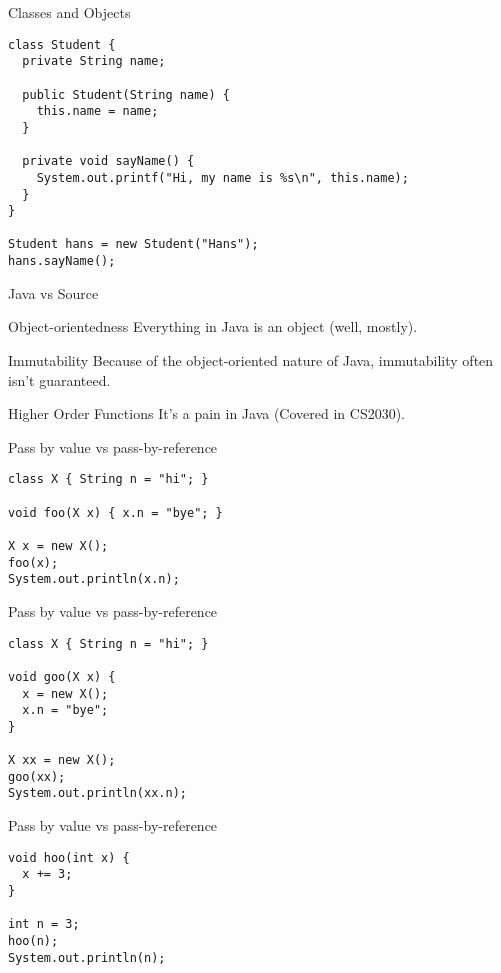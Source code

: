 \documentclass[presentation]{beamer}
\begin{document}
\begin{frame}[label={sec:org1b4f8ca},fragile]{Classes and Objects}
 \begin{verbatim}
class Student {
  private String name;

  public Student(String name) {
    this.name = name;
  }

  private void sayName() {
    System.out.printf("Hi, my name is %s\n", this.name);
  }
}

Student hans = new Student("Hans");
hans.sayName();
\end{verbatim}
\end{frame}
\begin{frame}[<+->][label={sec:org5042783}]{Java vs Source}
\begin{block}{Object-orientedness}
Everything in Java is an object (well, mostly).
\end{block}
\begin{block}{Immutability}
Because of the object-oriented nature of Java, immutability
often isn't guaranteed.
\end{block}
\begin{block}{Higher Order Functions}
It's a pain in Java (Covered in CS2030).
\end{block}
\end{frame}
\begin{frame}[label={sec:org6b306d6},fragile]{Pass by value vs pass-by-reference}
 \begin{verbatim}
class X { String n = "hi"; }

void foo(X x) { x.n = "bye"; }

X x = new X();
foo(x);
System.out.println(x.n);
\end{verbatim}
\end{frame}
\begin{frame}[label={sec:org64702a6},fragile]{Pass by value vs pass-by-reference}
 \begin{verbatim}
class X { String n = "hi"; }

void goo(X x) {
  x = new X();
  x.n = "bye";
}

X xx = new X();
goo(xx);
System.out.println(xx.n);
\end{verbatim}
\end{frame}
\begin{frame}[label={sec:org15f2263},fragile]{Pass by value vs pass-by-reference}
 \begin{verbatim}
void hoo(int x) {
  x += 3;
}

int n = 3;
hoo(n);
System.out.println(n);
\end{verbatim}
\end{frame}
\end{document}
